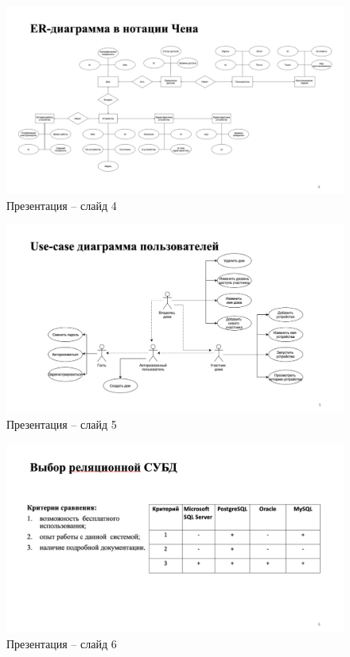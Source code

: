\begin{figure}[H]
    \includegraphics[width=1\linewidth]{img/4.png}
    \caption{Презентация -- слайд 4}
\end{figure}
\noindent

\begin{figure}[H]
    \includegraphics[width=1\linewidth]{img/5.png}
    \caption{Презентация -- слайд 5}
\end{figure}
\noindent

\begin{figure}[H]
    \includegraphics[width=1\linewidth]{img/6.png}
    \caption{Презентация -- слайд 6}
\end{figure}
\noindent

